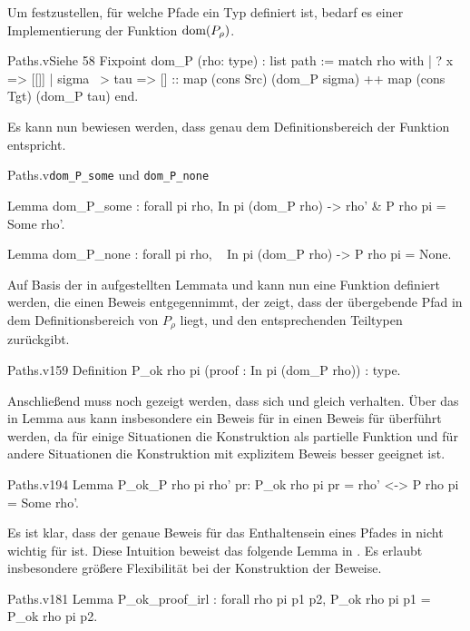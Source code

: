 Um festzustellen, für welche Pfade ein Typ definiert ist, bedarf es einer Implementierung der Funktion $\text{dom}(P_\rho)$.
\begin{code}[dom_P]{Paths.v}{Siehe }{58}
Fixpoint dom_P (rho: type) : list path :=
  match rho with
  | ? x => [[]]
  | sigma ~> tau => [] :: map (cons Src) (dom_P sigma) ++ 
      map (cons Tgt) (dom_P tau)
  end.
\end{code}

Es kann nun bewiesen werden, dass  genau dem Definitionsbereich der Funktion  entspricht.

\begin{multicode}{Paths.v}{}{\texttt{dom\_P\_some} und \texttt{dom\_P\_none}}
    \begin{mcode}{64}
Lemma dom_P_some : forall pi rho, In pi (dom_P rho) -> 
    { rho' & P rho pi = Some rho'}.
    \end{mcode}
\begin{mcode}{80}
Lemma dom_P_none : forall pi rho, ~ In pi (dom_P rho) -> P rho pi = None.
\end{mcode}
\end{multicode}
Auf Basis der in  aufgestellten Lemmata und  kann nun eine Funktion definiert werden, die einen Beweis entgegennimmt, der zeigt, dass der übergebende Pfad in dem Definitionsbereich von $P_\rho$ liegt, und den entsprechenden Teiltypen zurückgibt. 

\begin{code}[P_ok]{Paths.v}{}{159}
Definition P_ok rho pi (proof : In pi (dom_P rho)) : type.
\end{code}

Anschließend muss noch gezeigt werden, dass sich  und  gleich verhalten. Über das in Lemma aus  kann insbesondere ein Beweis für  in einen Beweis für  überführt werden, da für einige Situationen die Konstruktion als partielle Funktion und für andere Situationen die Konstruktion mit explizitem Beweis besser geeignet ist.
\begin{code}[P_ok_P]{Paths.v}{}{194}
Lemma P_ok_P {rho pi rho' pr}: P_ok rho pi pr = rho' <-> P rho pi = Some rho'.
\end{code}

Es ist klar, dass der genaue Beweis für das Enthaltensein eines Pfades in  nicht wichtig für  ist. Diese Intuition beweist das folgende Lemma in . Es erlaubt insbesondere größere Flexibilität bei der Konstruktion der Beweise.
\begin{code}{Paths.v}{}{181}
Lemma P_ok_proof_irl : forall rho pi p1 p2, 
    P_ok rho pi p1 = P_ok rho pi p2.
\end{code}

